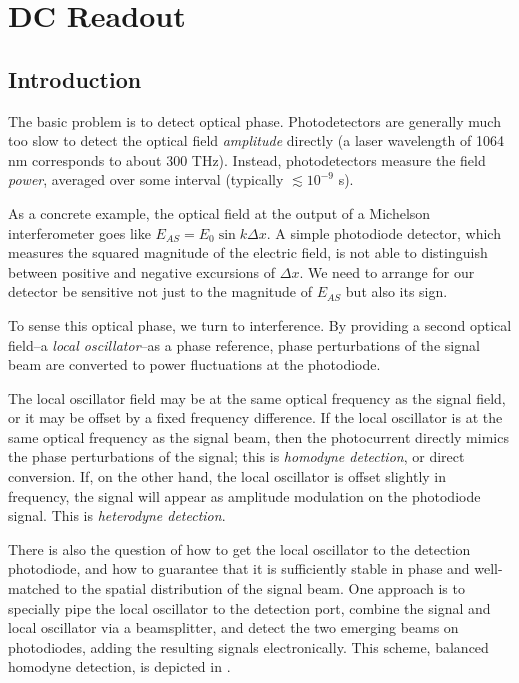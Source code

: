 \chapter{DC Readout}
\label{chapter3}
\section{Introduction}

The basic problem is to detect optical phase. Photodetectors are
generally much too slow to detect the optical field \emph{amplitude}
directly (a laser wavelength of 1064 nm corresponds to about 300 THz).
Instead, photodetectors measure the field \emph{power}, averaged over
some interval (typically $\lesssim 10^{-9}$ s).  

As a concrete example, the optical field at the output of a Michelson
interferometer goes like $E_{AS} = E_0 \sin k\Delta x$.  A simple
photodiode detector, which measures the squared magnitude of the
electric field, is not able to distinguish between positive and
negative excursions of $\Delta x$.  We need to arrange for our
detector be sensitive not just to the magnitude of $E_{AS}$ but also
its sign.

To sense this optical phase, we turn to interference.  By providing a
second optical field--a \emph{local oscillator}--as a phase reference,
phase perturbations of the signal beam are converted to power
fluctuations at the photodiode.

The local oscillator field may be at the same optical frequency as the
signal field, or it may be offset by a fixed frequency difference.
If the local oscillator is at the same optical frequency as the signal
beam, then the photocurrent directly mimics the phase perturbations of
the signal; this is \emph{homodyne detection}, or direct conversion.
If, on the other hand, the local oscillator is offset slightly in
frequency, the signal will appear as amplitude modulation on the
photodiode signal.  This is \emph{heterodyne detection}.

There is also the question of how to get the local oscillator to the
detection photodiode, and how to guarantee that it is sufficiently
stable in phase and well-matched to the spatial distribution of the
signal beam.  One approach is to specially pipe the local oscillator
to the detection port, combine the signal and local oscillator via a
beamsplitter, and detect the two emerging beams on photodiodes, adding
the resulting signals electronically.  This scheme, balanced homodyne
detection, is depicted in .

